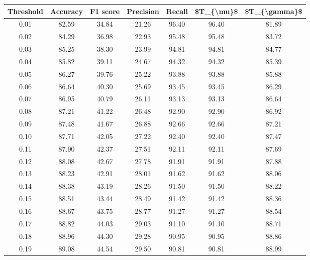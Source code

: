 \begin{tabular}{|c|c|c|c|c|c|c|}
\hline
 Threshold &  Accuracy &  F1 score &  Precision &  Recall &  \$T\_\{\textbackslash mu\}\$ &  \$T\_\{\textbackslash gamma\}\$ \\
\hline
      0.01 &     82.59 &     34.84 &      21.26 &   96.40 &      96.40 &         81.89 \\
      0.02 &     84.29 &     36.98 &      22.93 &   95.48 &      95.48 &         83.72 \\
      0.03 &     85.25 &     38.30 &      23.99 &   94.81 &      94.81 &         84.77 \\
      0.04 &     85.82 &     39.11 &      24.67 &   94.32 &      94.32 &         85.39 \\
      0.05 &     86.27 &     39.76 &      25.22 &   93.88 &      93.88 &         85.88 \\
      0.06 &     86.64 &     40.30 &      25.69 &   93.45 &      93.45 &         86.29 \\
      0.07 &     86.95 &     40.79 &      26.11 &   93.13 &      93.13 &         86.64 \\
      0.08 &     87.21 &     41.22 &      26.48 &   92.90 &      92.90 &         86.92 \\
      0.09 &     87.48 &     41.67 &      26.88 &   92.66 &      92.66 &         87.21 \\
      0.10 &     87.71 &     42.05 &      27.22 &   92.40 &      92.40 &         87.47 \\
      0.11 &     87.90 &     42.37 &      27.51 &   92.11 &      92.11 &         87.69 \\
      0.12 &     88.08 &     42.67 &      27.78 &   91.91 &      91.91 &         87.88 \\
      0.13 &     88.23 &     42.91 &      28.01 &   91.62 &      91.62 &         88.06 \\
      0.14 &     88.38 &     43.19 &      28.26 &   91.50 &      91.50 &         88.22 \\
      0.15 &     88.51 &     43.44 &      28.49 &   91.42 &      91.42 &         88.36 \\
      0.16 &     88.67 &     43.75 &      28.77 &   91.27 &      91.27 &         88.54 \\
      0.17 &     88.82 &     44.03 &      29.03 &   91.10 &      91.10 &         88.71 \\
      0.18 &     88.96 &     44.30 &      29.28 &   90.95 &      90.95 &         88.86 \\
      0.19 &     89.08 &     44.54 &      29.50 &   90.81 &      90.81 &         88.99 \\

\end{tabular}
